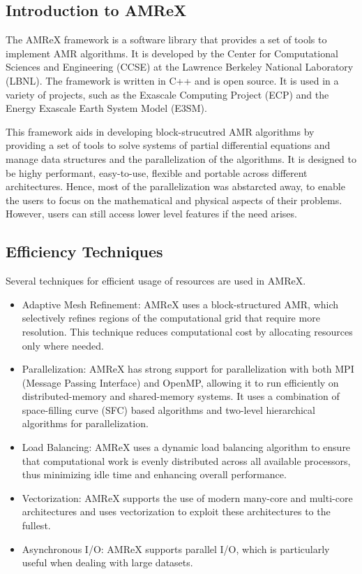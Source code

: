 \documentclass[12pt, a4paper]{scrartcl}
\begin{document}
\subsection{Introduction to AMReX}

The AMReX framework is a software library that provides a set of tools to implement AMR algorithms.
It is developed by the Center for Computational Sciences and Engineering (CCSE) at the Lawrence Berkeley National Laboratory (LBNL).
The framework is written in C++ and is open source. It is used in a variety of projects, such as the
Exascale Computing Project (ECP) and the Energy Exascale Earth System Model (E3SM).

This framework aids in developing block-strucutred AMR algorithms by providing a set of tools to
solve systems of partial differential equations and manage data structures and the parallelization of the algorithms.
It is designed to be highy performant, easy-to-use, flexible and portable across different architectures.
Hence, most of the parallelization was abstarcted away, to enable the users to focus on the mathematical and physical
aspects of their problems. However, users can still access lower level features if the need arises.

\subsection{Efficiency Techniques}

Several techniques for efficient usage of resources are used in AMReX.

\begin{itemize}
    \item Adaptive Mesh Refinement: AMReX uses a block-structured AMR, which selectively 
    refines regions of the computational grid that require more resolution.
    This technique reduces computational cost by allocating resources only where needed.
    \item Parallelization: AMReX has strong support for parallelization with both MPI (Message Passing Interface) 
    and OpenMP, allowing it to run efficiently on distributed-memory and shared-memory systems. 
    It uses a combination of space-filling curve (SFC) based algorithms and two-level hierarchical 
    algorithms for parallelization.
    \item Load Balancing: AMReX uses a dynamic load balancing algorithm to ensure that computational 
    work is evenly distributed across all available processors, thus minimizing idle time and enhancing 
    overall performance.
    \item Vectorization: AMReX supports the use of modern many-core and multi-core architectures 
    and uses vectorization to exploit these architectures to the fullest.
    \item Asynchronous I/O: AMReX supports parallel I/O, which is particularly useful when dealing with large datasets.
\end{itemize}
\end{document}
